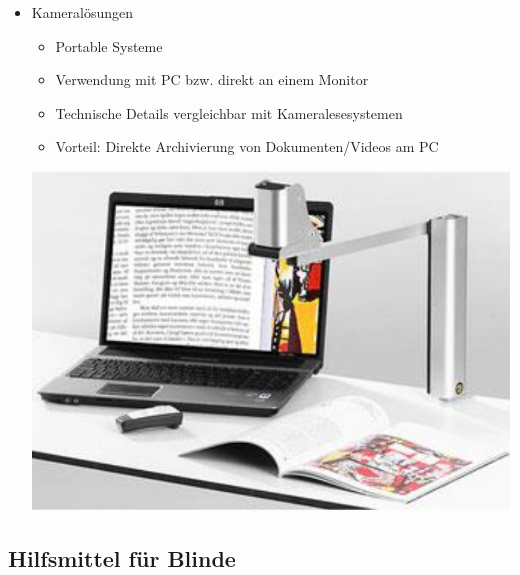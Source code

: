 \documentclass[paper=a4, fontsize=11pt]{scrartcl} %
\numberwithin{equation}{section} %
\numberwithin{figure}{section} %
\numberwithin{table}{section} %
\begin{document}
\begin{itemize}
\item Kameralösungen\\
\begin{minipage}[c]{0.55\textwidth}
\begin{itemize}
\item Portable Systeme
\item Verwendung mit PC bzw. direkt an einem Monitor
\item Technische Details vergleichbar mit Kameralesesystemen
\item Vorteil: Direkte Archivierung von Dokumenten/Videos am PC
\end{itemize}
\end{minipage}
\begin{minipage}[c]{0.3\textwidth}
\includegraphics[width=\textwidth]{imgs/kamera}
\end{minipage}
\end{itemize}

\subsection{Hilfsmittel für Blinde}
\end{document}
